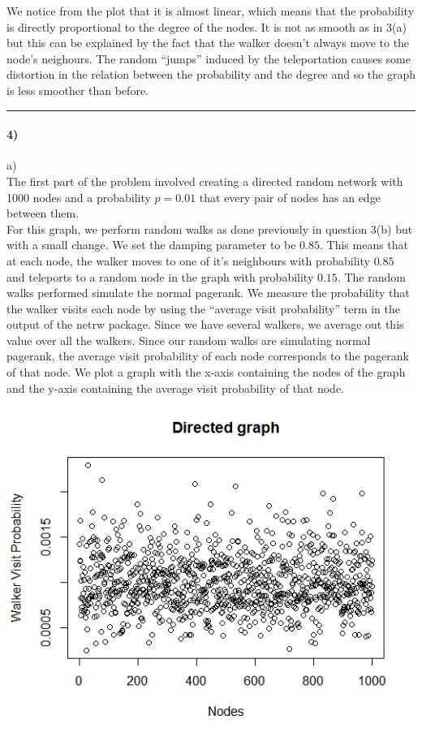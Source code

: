 \documentclass{article}
\begin{document}
We notice from the plot that it is almost linear, which means that the probability is directly proportional to the 
degree of the nodes. It is not as smooth as in 3(a) but this can be explained by the fact that
the walker doesn't always move to the node's neighours. The random ``jumps'' induced by the 
teleportation causes some distortion in the relation between the probability and the degree 
and so the graph is less smoother than before.\\

\hrule

\paragraph{4)}
a)\\
The first part of the problem involved creating a directed random network 
with 1000 nodes and a probability $p=0.01$ that every pair of nodes has an edge between them. \\
For this graph, we perform random walks as done previously in question 3(b) but with a small change.
We set the damping parameter to be $0.85$. This means that at each node, the walker
moves to one of it's neighbours with probability $0.85$ and teleports to a random node in the graph
with probability $0.15$. The random walks performed simulate the normal pagerank.
We measure the probability that the walker visits each node by using the ``average visit probability'' term
in the output of the netrw package. Since we have several walkers, we average out this value over all the walkers.
Since our random walks are simulating normal pagerank, the average visit probability of each node 
corresponds to the pagerank of that node. We plot a graph with the x-axis containing the nodes of the graph and the y-axis containing the 
average visit probability of that node.\\
\includegraphics[scale=0.4]{p4a} \\
\end{document}
